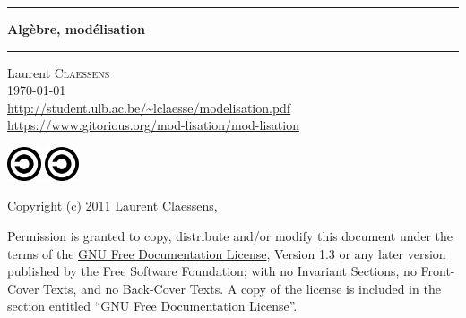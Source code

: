\thispagestyle{empty}
\begin{center}
  \begin{minipage}{15cm}
    \hrule\par
    \vspace{2mm}
    \begin{center}
    \Huge \bfseries Algèbre, modélisation \par
    \end{center}
    \hrule\par
  \end{minipage}
\end{center}

\vspace{2cm}

\begin{center}
    Laurent \textsc{Claessens}\\
    \today\\
    \url{http://student.ulb.ac.be/~lclaesse/modelisation.pdf}\\
    \url{https://www.gitorious.org/mod-lisation/mod-lisation}
\end{center}

\vfill

\begin{center}

           \ifpdf
            \includegraphics[width=1cm]{Copyleft.svg}
        \else
            \includegraphics[width=1cm]{Copyleft.eps}
        \fi



Copyright (c) 2011  Laurent Claessens,

Permission is granted to copy, distribute and/or modify this document under the terms of the \href{http://www.gnu.org/licenses/fdl-1.3.html}{GNU Free Documentation License}, Version 1.3 or any later version published by the Free Software Foundation; with no Invariant Sections, no Front-Cover Texts, and no Back-Cover Texts. A copy of the license is included in the section entitled ``GNU Free Documentation License''.


\end{center}

